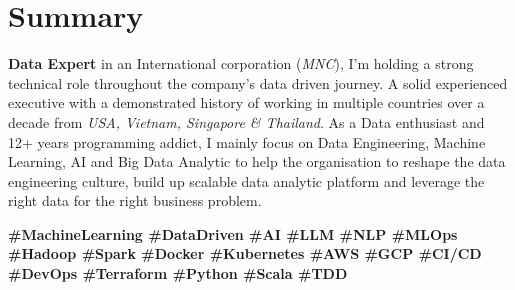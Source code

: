 \section{Summary}
  \textbf{Data Expert} in an International corporation (\emph{MNC}), I’m holding a strong technical role throughout the company’s data driven journey. A solid experienced executive with a demonstrated history of working in multiple countries over a decade from \emph{USA, Vietnam, Singapore \& Thailand}. As a Data enthusiast and 12+ years programming addict, I mainly focus on Data Engineering, Machine Learning, AI and Big Data Analytic to help the organisation to reshape the data engineering culture, build up scalable data analytic platform and leverage the right data for the right business problem.
  
  \textbf{\scriptsize{
    \#MachineLearning
    \#DataDriven
    \#AI
    \#LLM
    \#NLP
    \#MLOps
    \#Hadoop
    \#Spark                                                                                                                                                                                                                                                      
    \#Docker
    \#Kubernetes
    \#AWS
    \#GCP
    \#CI/CD
    \#DevOps
    \#Terraform
    \#Python
    \#Scala
    \#TDD
  }}
